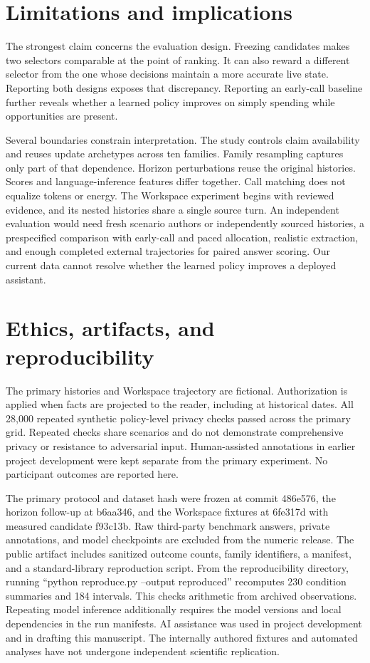 \documentclass[11pt]{article}
\begin{document}
\section{Limitations and implications}

The strongest claim concerns the evaluation design. Freezing candidates makes two selectors comparable at the point of ranking. It can also reward a different selector from the one whose decisions maintain a more accurate live state. Reporting both designs exposes that discrepancy. Reporting an early-call baseline further reveals whether a learned policy improves on simply spending while opportunities are present.

Several boundaries constrain interpretation. The study controls claim availability and reuses update archetypes across ten families. Family resampling captures only part of that dependence. Horizon perturbations reuse the original histories. Scores and language-inference features differ together. Call matching does not equalize tokens or energy. The Workspace experiment begins with reviewed evidence, and its nested histories share a single source turn. An independent evaluation would need fresh scenario authors or independently sourced histories, a prespecified comparison with early-call and paced allocation, realistic extraction, and enough completed external trajectories for paired answer scoring. Our current data cannot resolve whether the learned policy improves a deployed assistant.

\section{Ethics, artifacts, and reproducibility}

The primary histories and Workspace trajectory are fictional. Authorization is applied when facts are projected to the reader, including at historical dates. All 28,000 repeated synthetic policy-level privacy checks passed across the primary grid. Repeated checks share scenarios and do not demonstrate comprehensive privacy or resistance to adversarial input. Human-assisted annotations in earlier project development were kept separate from the primary experiment. No participant outcomes are reported here.

The primary protocol and dataset hash were frozen at commit 486e576, the horizon follow-up at b6aa346, and the Workspace fixtures at 6fe317d with measured candidate f93c13b. Raw third-party benchmark answers, private annotations, and model checkpoints are excluded from the numeric release. The public artifact \cite{tracemem} includes sanitized outcome counts, family identifiers, a manifest, and a standard-library reproduction script. From the reproducibility directory, running “python reproduce.py --output reproduced” recomputes 230 condition summaries and 184 intervals. This checks arithmetic from archived observations. Repeating model inference additionally requires the model versions and local dependencies in the run manifests. AI assistance was used in project development and in drafting this manuscript. The internally authored fixtures and automated analyses have not undergone independent scientific replication.
\end{document}

